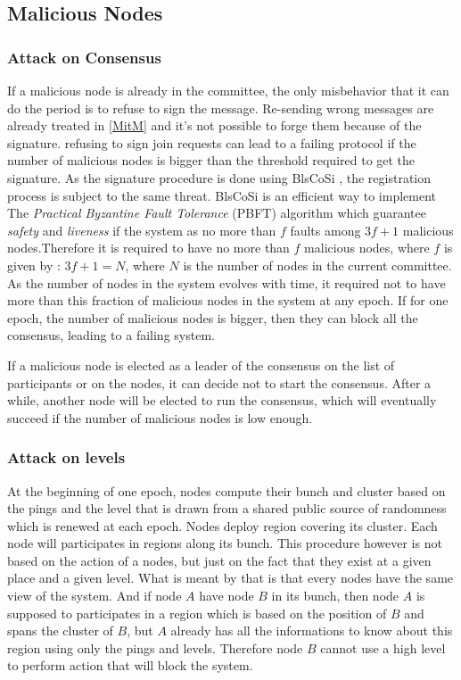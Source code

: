 \documentclass[a4paper,11pt,oneside]{report}
\begin{document}
\subsection{Malicious Nodes}
\subsubsection{Attack on Consensus}
If a malicious node is already in the committee, the only misbehavior that it
can do the period is to refuse to sign the message. Re-sending wrong messages
are already treated in \autoref{MitM} and it's not possible to forge them because
of the signature. refusing to sign join requests can lead to a failing protocol
if the number of malicious nodes is bigger than the threshold required to get
the signature. As the signature procedure is done using BlsCoSi \cite{Boneh2018},
the registration process is subject to the same threat. BlsCoSi
\cite{Boneh2018} is an efficient way to implement The \textit{Practical
Byzantine Fault Tolerance} (PBFT) \cite{Castro1999} algorithm which guarantee
\textit{safety} and \textit{liveness} if the system as no more than $f$ faults
among $3f+1$ malicious nodes.Therefore it is required to have no more than $f$
malicious nodes, where $f$ is given by : $3f + 1 = N$, where $N$ is the number
of nodes in the current committee. As the number of nodes in the system evolves
with time, it required not to have more than this fraction of malicious nodes
in the system at any epoch. If for one epoch, the number of malicious nodes is
bigger, then they can block all the consensus, leading to a failing system. 

If a malicious node is elected as a leader of the consensus on the list of
participants or on the nodes, it can decide not to start the consensus. After a
while, another node will be elected to run the consensus, which will eventually
succeed if the number of malicious nodes is low enough.

\subsubsection{Attack on levels}
At the beginning of one epoch, nodes compute their bunch and cluster based on
the pings and the level that is drawn from a shared public source of randomness
which is renewed at each epoch. Nodes deploy region covering its cluster. Each
node will participates in regions along its bunch. This procedure however is
not based on the action of a nodes, but just on the fact that they exist at a
given place and a given level. What is meant by that is that every nodes have
the same view of the system. And if node $A$ have node $B$ in its bunch, then
node $A$ is supposed to participates in a region which is based on the position
of $B$ and spans the cluster of $B$, but $A$ already has all the informations
to know about this region using only the pings and levels. Therefore node $B$
cannot use a high level to perform action that will block the system. 
\end{document}
